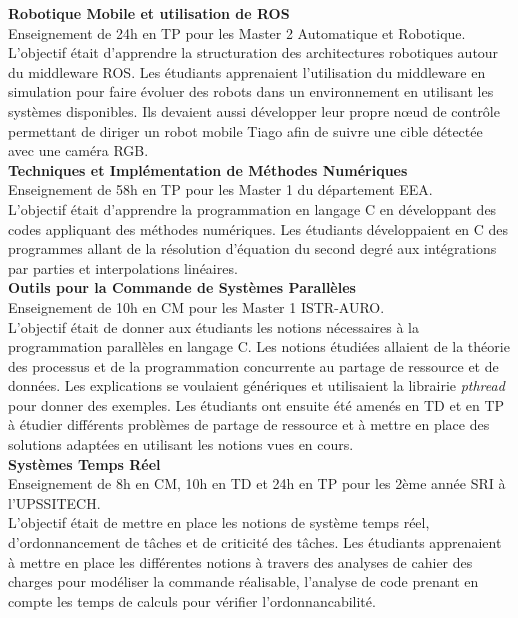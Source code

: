 \documentclass[11pt,a4paper,sans]{moderncv}         %
\begin{document}
{
  \textbf{Robotique Mobile et utilisation de ROS}\\
  Enseignement de 24h en TP pour les Master 2 Automatique et Robotique.\\
  L'objectif \'etait d'apprendre la structuration des architectures robotiques autour du middleware ROS.
  Les \'etudiants apprenaient l'utilisation du middleware en simulation pour faire \'evoluer des robots dans un environnement en utilisant les syst\`emes disponibles.
  Ils devaient aussi d\'evelopper leur propre n\oe ud de contr\^ole permettant de diriger un robot mobile Tiago afin de suivre une cible d\'etect\'ee avec une cam\'era RGB.\\
  \textbf{Techniques et Impl\'ementation de M\'ethodes Num\'eriques}\\
  Enseignement de 58h en TP pour les Master 1 du d\'epartement EEA.\\
  L'objectif \'etait d'apprendre la programmation en langage C en d\'eveloppant des codes appliquant des m\'ethodes num\'eriques.
  Les \'etudiants d\'eveloppaient en C des programmes allant de la r\'esolution d'\'equation du second degr\'e aux int\'egrations par parties et interpolations lin\'eaires.\\
  \textbf{Outils pour la Commande de Syst\`emes Parall\`eles}\\
  Enseignement de 10h en CM pour les Master 1 ISTR-AURO.\\
  L'objectif \'etait de donner aux \'etudiants les notions n\'ecessaires \`a la programmation parall\`eles en langage C.
  Les notions \'etudi\'ees allaient de la th\'eorie des processus et de la programmation concurrente au partage de ressource et de donn\'ees.
  Les explications se voulaient g\'en\'eriques et utilisaient la librairie \emph{pthread} pour donner des exemples.
  Les \'etudiants ont ensuite \'et\'e amen\'es en TD et en TP \`a \'etudier diff\'erents probl\`emes de partage de ressource et \`a mettre en place des solutions adapt\'ees en utilisant les notions vues en cours.\\
  \textbf{Syst\`emes Temps R\'eel}\\
  Enseignement de 8h en CM, 10h en TD et 24h en TP pour les 2\`eme ann\'ee SRI \`a l'UPSSITECH.\\
  L'objectif \'etait de mettre en place les notions de syst\`eme temps r\'eel, d'ordonnancement de t\^aches et de criticit\'e des t\^aches.
  Les \'etudiants apprenaient \`a mettre en place les diff\'erentes notions \`a travers des analyses de cahier des charges pour mod\'eliser la commande r\'ealisable, l'analyse de code prenant en compte les temps de calculs pour v\'erifier l'ordonnancabilit\'e.
}
\end{document}
